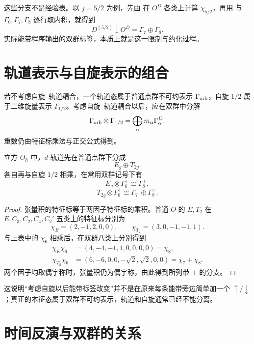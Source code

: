 这些分支不是经验表。以 $j=5/2$ 为例，先由  在 $O^D$ 各类上计算 $\chi_{5/2}$，再用  与 $\Gamma_6,\Gamma_7,\Gamma_8$ 逐行取内积，就得到
\[
D^{(5/2)}\downarrow O^D=\Gamma_7\oplus\Gamma_8.
\]
实际能带程序输出的双群标签，本质上就是这一限制与约化过程。

\section{轨道表示与自旋表示的组合}

若不考虑自旋--轨道耦合，一个轨道态属于普通点群不可约表示 $\Gamma_{\rm orb}$，自旋 $1/2$ 属于二维旋量表示 $\Gamma_{1/2}$。考虑自旋--轨道耦合以后，应在双群中分解
\begin{equation}
\Gamma_{\rm orb}\otimes\Gamma_{1/2}
=\bigoplus_\alpha m_\alpha\Gamma_\alpha^D.
\label{eq:orbital-spin-double-product}
\end{equation}
重数仍由特征标乘法与正交公式得到。

\begin{proposition}[立方 $d$ 轨道与自旋的张量积分解]
立方 $O_h$ 中，$d$ 轨道先在普通点群下分成
\[
E_g\oplus T_{2g}.
\]
各自再与自旋 $1/2$ 相乘，在常用双群记号下有
\[
E_g\otimes\Gamma_6^+\cong\Gamma_8^+,
\]
\[
T_{2g}\otimes\Gamma_6^+\cong\Gamma_7^+\oplus\Gamma_8^+.
\]
\end{proposition}
\begin{proof}
张量积的特征标等于两因子特征标的乘积。普通 $O$ 的 $E,T_2$ 在 $E,C_3,C_2,C_4,C_2'$ 五类上的特征标分别为
\[
\chi_E=(2,-1,2,0,0),\qquad \chi_{T_2}=(3,0,-1,-1,1).
\]
与上表中的 $\chi_6$ 相乘后，在双群八类上分别得到
\begin{align*}
\chi_E\chi_6&=(4,-4,-1,1,0,0,0,0)=\chi_8,\\
\chi_{T_2}\chi_6&=(6,-6,0,0,-\sqrt2,\sqrt2,0,0)=\chi_7+\chi_8.
\end{align*}
两个因子均取偶宇称时，张量积仍为偶宇称，由此得到所列带 $+$ 的分支。
\end{proof}
这说明“考虑自旋以后能带标签改变”并不是在原来每条能带旁边简单加一个 $\uparrow/\downarrow$；真正的本征态属于双群不可约表示，轨道和自旋通常已经不能分离。

\section{时间反演与双群的关系}

